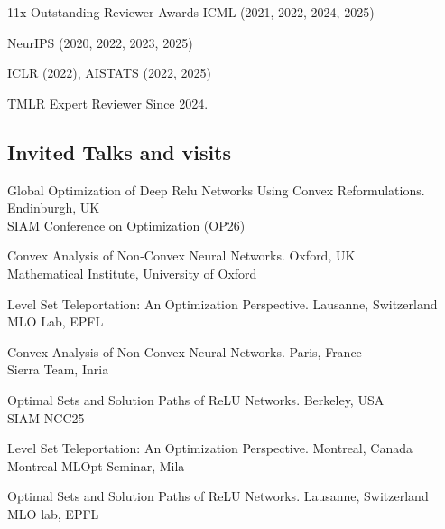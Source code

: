 11x Outstanding Reviewer Awards
\hfill	ICML (2021, 2022, 2024, 2025)

\vspace{-1ex}
\hfill NeurIPS (2020, 2022, 2023, 2025)

\vspace{-1ex}
\hfill ICLR (2022), AISTATS (2022, 2025)

TMLR Expert Reviewer \hfill Since 2024.

\vspace{2ex}

\subsection{Invited Talks and visits}
\newcommand{\where}[1]{{#1}}
\begin{description}[leftmargin=\mleftsize,style=nextline,font=\normalfont\space]
    \item[2026] Global Optimization of Deep Relu Networks Using Convex Reformulations. \hfill Endinburgh, UK \\
          SIAM Conference on Optimization (OP26)

    \item[2026] Convex Analysis of Non-Convex Neural Networks.  \hfill Oxford, UK\\
          Mathematical Institute, University of Oxford

    \item[2026] Level Set Teleportation: An Optimization Perspective.  \hfill Lausanne, Switzerland\\
          MLO Lab, EPFL

    \item[2026] Convex Analysis of Non-Convex Neural Networks. \hfill Paris, France\\
          Sierra Team, Inria

    \item[2025] Optimal Sets and Solution Paths of ReLU Networks. \hfill Berkeley, USA\\
          SIAM NCC25

    \item[2025] Level Set Teleportation: An Optimization Perspective. \hfill Montreal, Canada\\
          Montreal MLOpt Seminar, Mila

    \item[2024] Optimal Sets and Solution Paths of ReLU Networks. \hfill Lausanne, Switzerland\\
          MLO lab, EPFL


\end{description}
